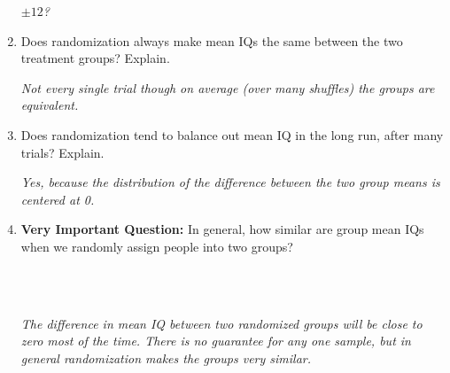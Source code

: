 \begin{enumerate}
\begin{key}
   {\it $\pm 12$?}
\end{key}

\item  Does randomization always make mean IQs the same
  between the two treatment groups? Explain. 
\begin{students}
 \vspace{3cm} 
\end{students}

\begin{key}
  {\it  Not  every single trial though on average (over many
    shuffles) the groups are   equivalent.  }
\end{key}
  
\item  Does randomization tend to balance out mean IQ in the long
  run, after many trials? Explain. 
\begin{students}
 \vspace{3cm} 
\end{students}

\begin{key}
  {\it  Yes, because the distribution of the difference between the two
   group means is centered at 0. }
\end{key}


  
\item {\bf Very Important Question:}  In general, how similar are
  group mean IQs when we randomly assign people into two groups?
\begin{students}
        \vspace{4cm}\\
\end{students}
\begin{key}
  \\ {\it  The difference in mean IQ between two randomized groups
    will be close to zero most of the time.  There is no guarantee for
  any one sample, but in general randomization makes the groups very
  similar.} 
\end{key}



\end{enumerate}
